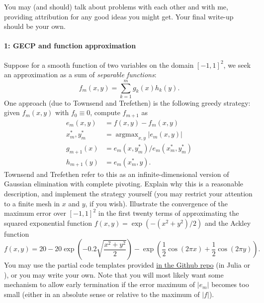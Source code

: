 \documentclass[12pt, leqno]{article} %
\begin{document}

You may (and should) talk about problems with each other and with me,
providing attribution for any good ideas you might get.  Your final
write-up should be your own.


\paragraph*{1: GECP and function approximation}
Suppose for a smooth function of two variables on the domain
$[-1,1]^2$, we seek an approximation as a sum of {\em separable functions}:
\[
  f_m(x,y) = \sum_{k=1}^m g_k(x) h_k(y).
\]
One approach (due to Townsend and Trefethen) is the following greedy
strategy: given $f_m(x,y)$ with $f_0 \equiv 0$, compute $f_{m+1}$ as
\begin{align*}
  e_{m}(x,y) &= f(x,y) - f_m(x,y) \\
  x_m^*, y_m^* &= \operatorname{argmax}_{x,y} |e_m(x,y)| \\
  g_{m+1}(x) &= e_m(x, y_m^*) / e_m(x_m^*, y_m^*) \\
  h_{m+1}(y) &= e_m(x_m^*, y).
\end{align*}
Townsend and Trefethen refer to this as an infinite-dimensional
version of Gaussian elimination with complete pivoting.  Explain why
this is a reasonable description, and implement the strategy yourself
(you may restrict your attention to a finite mesh in $x$ and $y$, if
you wish).  Illustrate the convergence of the maximum error over
$[-1,1]^2$ in the first twenty terms of approximating the squared
exponential function $f(x,y) = \exp(-(x^2+y^2)/2)$ and the Ackley function
\[
  f(x,y) =
  20
  -20 \exp\left( -0.2 \sqrt{\frac{x^2+y^2}{2}} \right)
  -\exp\left( \frac{1}{2} \cos(2\pi x) + \frac{1}{2} \cos(2\pi y) \right).
\]
You may use the partial code templates provided
\href{https://github.com/dbindel/cs6210-f19/tree/master/hw/code/hw4}{in the Github
  repo}
(in Julia or \matlab), or you may write your own.  Note that you will
most likely want some mechanism to allow early termination if the
error maximum of $|e_m|$ becomes too small (either in an absolute
sense or relative to the maximum of $|f|$).
\end{document}
